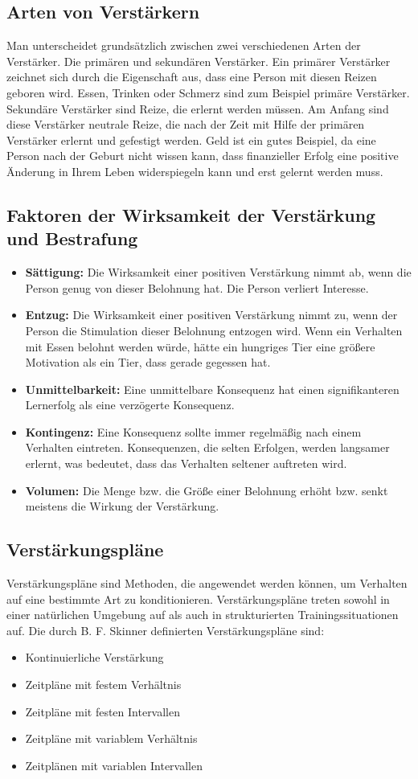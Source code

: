 \subsection{Arten von Verstärkern}
Man unterscheidet grundsätzlich zwischen zwei verschiedenen Arten der Verstärker. Die primären und sekundären Verstärker. 
Ein primärer Verstärker zeichnet sich durch die Eigenschaft aus, dass eine Person mit diesen Reizen geboren wird. Essen, Trinken oder Schmerz sind zum Beispiel primäre Verstärker. 
Sekundäre Verstärker sind Reize, die erlernt werden müssen. Am Anfang sind diese Verstärker neutrale Reize, die nach der Zeit mit Hilfe der primären Verstärker erlernt und gefestigt werden. Geld ist ein gutes Beispiel, da eine Person nach der Geburt nicht wissen kann, dass finanzieller Erfolg eine positive Änderung in Ihrem Leben widerspiegeln kann und erst gelernt werden muss. 
\subsection{Faktoren der Wirksamkeit der Verstärkung und Bestrafung}	
\begin{itemize}
	\item \textbf{Sättigung:} Die Wirksamkeit einer positiven Verstärkung nimmt ab, wenn die Person genug von dieser Belohnung hat. Die Person verliert Interesse.
	\item \textbf{Entzug:} Die Wirksamkeit einer positiven Verstärkung nimmt zu, wenn der Person die Stimulation dieser Belohnung entzogen wird. Wenn ein Verhalten mit Essen belohnt werden würde, hätte ein hungriges Tier eine größere Motivation als ein Tier, dass gerade gegessen hat. 
	\item \textbf{Unmittelbarkeit:} Eine unmittelbare Konsequenz hat einen signifikanteren Lernerfolg als eine verzögerte Konsequenz. 
	\item \textbf{Kontingenz:} Eine Konsequenz sollte immer regelmäßig nach einem Verhalten eintreten. Konsequenzen, die selten Erfolgen, werden langsamer erlernt, was bedeutet, dass das Verhalten seltener auftreten wird. 
	\item \textbf{Volumen:} Die Menge bzw. die Größe einer Belohnung erhöht bzw. senkt meistens die Wirkung der Verstärkung. 
\end{itemize}
\newpage
\subsection{Verstärkungspläne}
Verstärkungspläne sind Methoden, die angewendet werden können, um Verhalten auf eine bestimmte Art zu konditionieren. 
Verstärkungspläne treten sowohl in einer natürlichen Umgebung auf als auch in strukturierten Trainingssituationen auf. 
Die durch B. F. Skinner definierten Verstärkungspläne sind: 
\begin{itemize}
	\item Kontinuierliche Verstärkung
	\item Zeitpläne mit festem Verhältnis
	\item Zeitpläne mit festen Intervallen
	\item Zeitpläne mit variablem Verhältnis
	\item Zeitplänen mit variablen Intervallen
\end{itemize}
